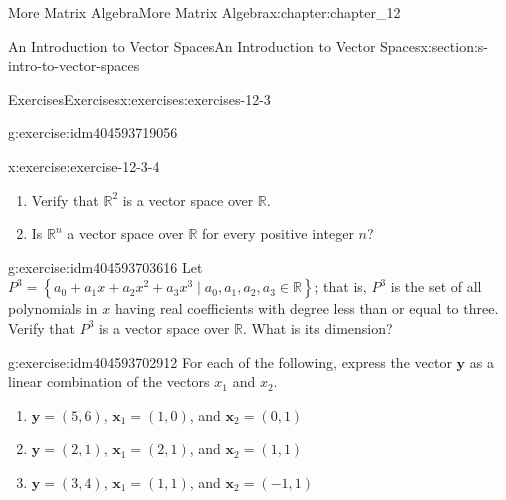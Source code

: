 \documentclass[twoside,10pt,]{book}
\numberwithin{equation}{section}
\renewcommand{\vec}[1]{\mathbf{#1}}
\begin{document}
\begin{chapterptx}{More Matrix Algebra}{}{More Matrix Algebra}{}{}{x:chapter:chapter_12}
\begin{sectionptx}{An Introduction to Vector Spaces}{}{An Introduction to Vector Spaces}{}{}{x:section:s-intro-to-vector-spaces}
\begin{exercises-subsection}{Exercises}{}{Exercises}{}{}{x:exercises:exercises-12-3}
\begin{divisionexercise}{3}{}{}{g:exercise:idm404593719056}
\end{divisionexercise}%
\begin{divisionexercise}{4}{}{}{x:exercise:exercise-12-3-4}%
%
\begin{enumerate}[label=(\alph*)]
\item{}Verify that \(\mathbb{R}^2\) is a vector space over \(\mathbb{R}\).%
\item{}Is \(\mathbb{R}^n\) a vector space over \(\mathbb{R}\) for every positive integer \(n\)?%
\end{enumerate}
%
\end{divisionexercise}%
\begin{divisionexercise}{5}{}{}{g:exercise:idm404593703616}%
Let \(P^3= \left\{a_0 + a_1x + a_2x^2 + a_3x^3 \mid a_0,a_1,a_2,a_3\in \mathbb{R}\right\}\); that is, \(P^3\) is the set of all polynomials in \(x\) having real coefficients with degree less than or equal to three. Verify that \(P^3\) is a vector space over \(\mathbb{R}\). What is its dimension?%
\end{divisionexercise}%
\begin{divisionexercise}{6}{}{}{g:exercise:idm404593702912}%
For each of the following, express the vector \(\pmb{y}\) as a linear combination of the vectors \(x_1\) and \(x_2\).%
\begin{enumerate}[label=(\alph*)]
\item{}\(\vec{y} = (5, 6)\),  \(\vec{x}_1 =(1, 0)\), and \(\vec{x}_2 = (0, 1)\)%
\item{}\(\vec{y} = (2, 1)\),  \(\vec{x}_1 =(2, 1)\), and  \(\vec{x}_2 = (1, 1)\)%
\item{}\(\vec{y} = (3,4)\),   \(\vec{x}_1 = (1, 1)\), and  \(\vec{x}_2 = (-1, 1)\)%
\end{enumerate}
%
\end{divisionexercise}%
\end{exercises-subsection}
\end{sectionptx}
\end{chapterptx}
\end{document}

